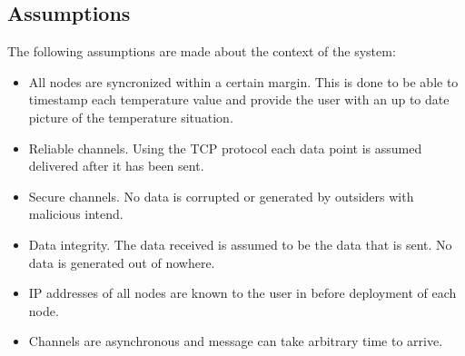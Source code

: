 \subsection{Assumptions}
\label{subsec:assumptions}
The following assumptions are made about the context of the system:
\begin{itemize}
    \item All nodes are syncronized within a certain margin. This is done to be able to timestamp each temperature value and provide the user with an up to date picture of the temperature situation. 
    \item Reliable channels. Using the TCP protocol each data point is assumed delivered after it has been sent. %
    \item Secure channels. No data is corrupted or generated by outsiders with malicious intend.
    \item Data integrity. The data received is assumed to be the data that is sent. No data is generated out of nowhere.
    \item IP addresses of all nodes are known to the user in before deployment of each node.
    \item Channels are asynchronous and message can take arbitrary time to arrive.
\end{itemize}
